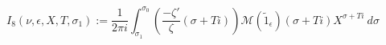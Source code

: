 \begin{definition}[I₈]
\label{I8}
\leanok
$$
  I_8(\nu, \epsilon, X, T, \sigma_1) := \frac{1}{2\pi i} \int_{\sigma_1}^{\sigma_0}
  \left(
  \frac{-\zeta'}\zeta(\sigma + T i)
  \right)
    \mathcal M(\widetilde 1_\epsilon)(\sigma + T i)
  X^{\sigma + T i} \ d\sigma
  $$
\end{definition}
